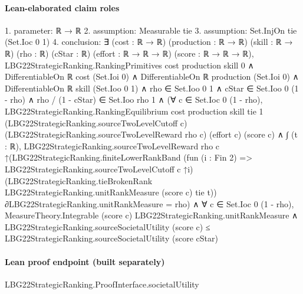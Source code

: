 \documentclass[10pt]{article}
\begin{document}
\paragraph{Lean-elaborated claim roles}\begin{ReviewVerbatim}
1. parameter: ℝ → ℝ
2. assumption: Measurable tie
3. assumption: Set.InjOn tie (Set.Ioc 0 1)
4. conclusion: ∃ (cost : ℝ → ℝ) (production : ℝ → ℝ) (skill : ℝ → ℝ) (rho : ℝ) (cStar : ℝ) (effort : ℝ → ℝ → ℝ) (score : ℝ → ℝ → ℝ),
  LBG22StrategicRanking.RankingPrimitives cost production skill 0 ∧
    DifferentiableOn ℝ cost (Set.Ioi 0) ∧
      DifferentiableOn ℝ production (Set.Ioi 0) ∧
        DifferentiableOn ℝ skill (Set.Ioo 0 1) ∧
          rho ∈ Set.Ioo 0 1 ∧
            cStar ∈ Set.Ioo 0 (1 - rho) ∧
              rho / (1 - cStar) ∈ Set.Ioo rho 1 ∧
                (∀ c ∈ Set.Ioc 0 (1 - rho),
                    LBG22StrategicRanking.RankingEquilibrium cost production skill tie 1
                        (LBG22StrategicRanking.sourceTwoLevelCutoff c)
                        (LBG22StrategicRanking.sourceTwoLevelReward rho c) (effort c) (score c) ∧
                      ∫ (t : ℝ),
                          LBG22StrategicRanking.sourceTwoLevelReward rho c
                            ↑(LBG22StrategicRanking.finiteLowerRankBand
                                (fun (i : Fin 2) => LBG22StrategicRanking.sourceTwoLevelCutoff c ↑i)
                                (LBG22StrategicRanking.tieBrokenRank LBG22StrategicRanking.unitRankMeasure (score c) tie
                                  t)) ∂LBG22StrategicRanking.unitRankMeasure =
                        rho) ∧
                  ∀ c ∈ Set.Ioc 0 (1 - rho),
                    MeasureTheory.Integrable (score c) LBG22StrategicRanking.unitRankMeasure ∧
                      LBG22StrategicRanking.sourceSocietalUtility (score c) ≤
                        LBG22StrategicRanking.sourceSocietalUtility (score cStar)
\end{ReviewVerbatim}

\paragraph{Lean proof endpoint (built separately)}\begin{ReviewVerbatim}
LBG22StrategicRanking.ProofInterface.societalUtility
\end{ReviewVerbatim}
\end{document}
